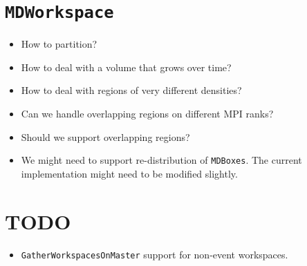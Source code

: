 \documentclass[a4paper,english,numbers=noenddot,bibliography=totoc,chapterprefix=on,DIV=12]{scrartcl}
\begin{document}
\section{\texttt{MDWorkspace}}

\begin{itemize}
  \item How to partition?
  \item How to deal with a volume that grows over time?
  \item How to deal with regions of very different densities?
  \item Can we handle overlapping regions on different MPI ranks?
  \item Should we support overlapping regions?
  \item We might need to support re-distribution of \texttt{MDBoxes}.
    The current implementation might need to be modified slightly.
\end{itemize}

\section{TODO}

\begin{itemize}
  \item \texttt{GatherWorkspacesOnMaster} support for non-event workspaces.
\end{itemize}
\end{document}
